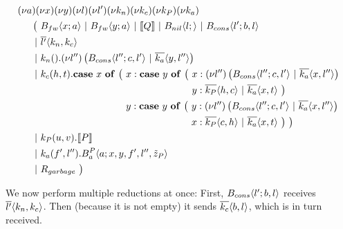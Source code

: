 \begin{align*}
  &\anew{a}{\anew{x}{\anew{y}{\anew{l}{\anew{l'}{\anew{k_n}{\anew{k_c}{\anew{k_P}{\anew{k_a}{ \\
    &\hspace{0.5cm}
    \begin{aligned}[t]
      \big(\ &\ains{B_{fw}}{x}{a}
      \apar   \ains{B_{fw}}{y}{a}
      \apar   \encMJtoAP{Q}
      \apar   \ains{B_{nil}}{l}{}
      \apar   \ains{B_{cons}}{l'}{b, l}
      \\
      \apar  &\asnd{l'}{k_n,k_c}
      \\
      \apar  &\arcv{k_n}{} . \anew{l''}{\parens{\ains{B_{cons}}{l''}{c, l'} \apar \asnd{k_a}{y, l''}}}
      \\
      \apar  &\arcv{k_c}{h,t} .
        \begin{aligned}[t]
          \acse*{x}{\big(\ 
            &\aalt{x}{
              \begin{aligned}[t]
                \acse*{y}{\big(\ 
                  &\aalt{x}{\anew*{l''}{
                    \ains{B_{cons}}{l''}{c,l'} \apar \asnd{k_a}{x,l''}
                  }}\\
                  &\aalt{y}{
                    \asnd{k_P}{h,c} \apar \asnd{k_a}{x,t}
                  }\ 
                \big)}
              \end{aligned}
            }\\
            &\aalt{y}{
              \begin{aligned}[t]
                \acse*{y}{\big(\ 
                  &\aalt{y}{\anew*{l''}{
                    \ains{B_{cons}}{l''}{c,l'} \apar \asnd{k_a}{x,l''}
                  }}\\
                  &\aalt{x}{
                    \asnd{k_P}{c,h} \apar \asnd{k_a}{x,t}
                  }\ 
                \big)}
                \ \big)
              \end{aligned}
            }\ 
          }
        \end{aligned}
      \\
      \apar  &\arcv{k_P}{u,v} . \encMJtoAP{P}
      \\
      \apar  &\arcv{k_a}{f',l''} . \ains{B_a^P}{a}{x, y, f', l'',\tilde{z}_P}
      \\
      \apar  &R_{garbage}
      \ \big)
    \end{aligned}
  }}}}}}}}}
\end{align*}

We now perform multiple reductions at once:
First, $B_{cons} \langle l' ; b,l \rangle$ receives $\overline{l'}\langle k_n,k_c\rangle$.
Then (because it is not empty) it sends $\overline{k_c}\langle b,l\rangle$,
which is in turn received.

